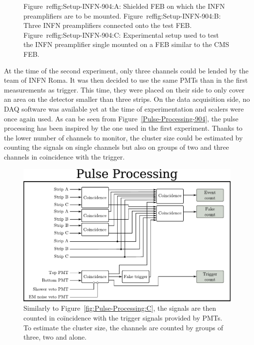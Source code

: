 \begin{figure}[H]
\begin{subfigure}{\linewidth}
			\caption{\label{fig:Setup-INFN-904:C}}
		\end{subfigure}
		\caption{\label{fig:Setup-INFN-904} Figure~ref{fig:Setup-INFN-904:A}: Shielded \acl{FEB} on which the INFN preamplifiers are to be mounted. Figure~ref{fig:Setup-INFN-904:B}: Three INFN preamplifiers connected onto the test FEB. Figure~ref{fig:Setup-INFN-904:C}: Experimental setup used to test the INFN preamplifier single mounted on a FEB similar to the CMS FEB.}
    \end{figure}
	
	At the time of the second experiment, only three channels could be lended by the team of INFN Roma. It was then decided to use the same PMTs than in the first measurements as trigger. This time, they were placed on their side to only cover an area on the detector smaller than three strips. On the data acquisition side, no DAQ software was available yet at the time of experimentation and scalers were once again used. As can be seen from Figure~\ref{Pulse-Processing-904}, the pulse processing has been inspired by the one used in the first experiment. Thanks to the lower number of channels to monitor, the cluster size could be estimated by counting the signals on single channels but also on groups of two and three channels in coincidence with the trigger.
	
	\begin{figure}[H]
		\centering
		\includegraphics[width=.8\linewidth]{fig/chapt6/pulse-processing-2014.pdf}
		\caption{\label{fig:fig:Pulse-Processing-904} Similarly to Figure~\ref{fig:Pulse-Processing:C}, the signals are then counted in coïncidence with the trigger signals provided by PMTs. To estimate the cluster size, the channels are counted by groups of three, two and alone.}
	\end{figure}
	
